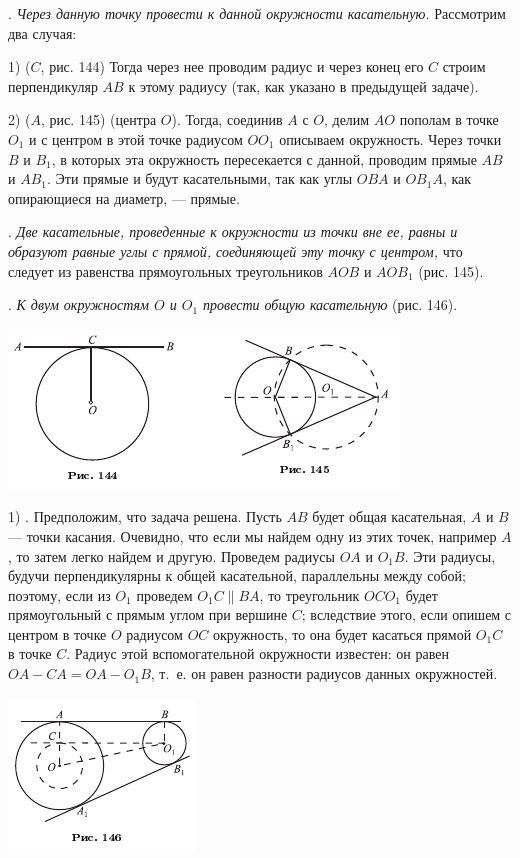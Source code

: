 \documentclass[oneside]{book}
\begin{document}
.
\emph{Через данную точку провести к данной окружности касательную.}
Рассмотрим два случая:

1)  ($C$, рис. 144) 
Тогда через нее проводим радиус и через конец его $C$ строим перпендикуляр $AB$ к этому радиусу (так, как указано в предыдущей задаче).

2)  ($A$, рис. 145)  (центра $O$).
Тогда, соединив $A$ с $O$, делим $AO$ пополам в точке $O_1$ и с центром в этой точке радиусом $OO_1$ описываем окружность.
Через точки $B$ и $B_1$, в которых эта окружность пересекается с данной, проводим прямые $AB$ и $AB_1$.
Эти прямые и будут касательными, так как углы $OBA$ и $OB_1A$, как опирающиеся на диаметр, — прямые.

.
\emph{Две касательные, проведенные к окружности из точки вне ее, равны и образуют равные углы с прямой, соединяющей эту точку с центром,} что следует из равенства прямоугольных треугольников $AOB$ и $AOB_1$ (рис. 145).

.
\emph{К двум окружностям %
$O$ и $O_1$ провести общую касательную} (рис. 146).

\includegraphics{pics/ris-144-145}

1) .
Предположим, что задача решена.
Пусть $AB$ будет общая касательная, $A$ и $B$ — точки касания.
Очевидно, что если мы найдем одну из этих точек, например $A$, то затем легко найдем и другую.
Проведем радиусы $OA$ и $O_1B$.
Эти радиусы, будучи перпендикулярны к общей касательной, параллельны между собой;
поэтому, если из $O_1$ проведем $O_1C\parallel BA$, то треугольник $OCO_1$ будет прямоугольный с прямым углом при вершине $C$;
вследствие этого, если опишем с центром в точке $O$ радиусом $OC$ окружность, то она будет касаться прямой $O_1C$ в точке $C$.
Радиус этой вспомогательной окружности известен:
он равен $OA-CA=OA-O_1B$, т.~е.
он равен разности радиусов данных окружностей.

\includegraphics{pics/ris-146}
\end{document}
